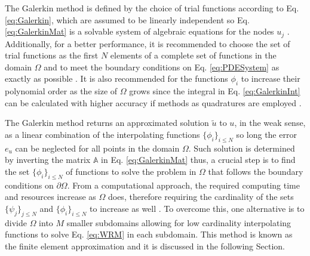     The Galerkin method is defined by the choice of trial functions according to Eq. \eqref{eq:Galerkin}, which are assumed to be linearly independent so Eq. \eqref{eq:GalerkinMat} is a solvable system of algebraic equations for the nodes $u_j$ \cite{fletcher_computational_1984}. Additionally, for a  better performance, it is recommended to choose the set of trial functions as the first $N$ elements of a complete set of functions in the domain $\Omega$ and to meet the boundary conditions on Eq. \eqref{eq:PDESystem} as exactly as possible \cite{fletcher_computational_1984}. It is also recommended for the functions $\phi_i$ to increase their polynomial order as the size of $\Omega$ grows since the integral in   Eq. \eqref{eq:GalerkinInt} can be calculated with higher accuracy if methods as quadratures are employed \cite{fletcher_computational_1984}.

    The Galerkin method returns an approximated solution $\tilde{u}$ to $u$, in the weak sense, as a linear combination of the interpolating functions $\{\phi_i\}_{i\leq N}$ so long the error $e_{u}$ can be neglected for all points in the domain $\Omega$.  Such solution is determined by inverting the matrix $\mathbb{A}$ in Eq. \eqref{eq:GalerkinMat} thus, a crucial step is to find the set $\{\phi_i\}_{i\leq N}$ of functions to solve the problem in $\Omega$ that follows the boundary conditions on $\partial\Omega$.  From a computational approach, the required computing time and resources increase as $\Omega$ does, therefore requiring the cardinality of the sets $\{\psi_j\}_{j\leq N}$ and  $\{\phi_i\}_{i\leq N}$ to increase as well \cite{dhatt_finite_2012}. To overcome this, one alternative is to divide $\Omega$ into $M$ smaller subdomains allowing for low cardinality interpolating functions to solve Eq. \eqref{eq:WRM}  in each subdomain.  This method is known as the finite element approximation and it is discussed in the following Section.
